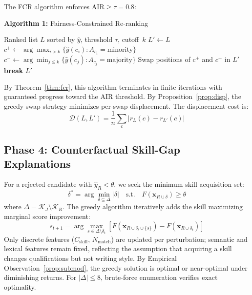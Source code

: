\documentclass[smallcondensed,numbers]{sn-jnl}
\begin{document}
The FCR algorithm enforces $\mathrm{AIR} \geq \tau = 0.8$:

\vspace{3pt}
\noindent\textbf{Algorithm 1:} Fairness-Constrained Re-ranking
\begin{algorithmic}[1]
\REQUIRE Ranked list $L$ sorted by $\hat{y}$, threshold $\tau$, cutoff~$k$
\STATE $L' \leftarrow L$
    \STATE $c^+ \leftarrow \arg\max_{i > k}\{\hat{y}(c_i) : A_{c_i} = \text{minority}\}$
    \STATE $c^- \leftarrow \arg\min_{j \leq k}\{\hat{y}(c_j) : A_{c_j} = \text{majority}\}$
        \STATE Swap positions of $c^+$ and $c^-$ in $L'$
    \ELSE
        \STATE \textbf{break}
    \ENDIF
\ENDWHILE
\RETURN $L'$
\end{algorithmic}
\vspace{3pt}

By Theorem~\ref{thm:fcr}, this algorithm terminates in finite iterations with guaranteed progress toward the AIR threshold. By Proposition~\ref{prop:disp}, the greedy swap strategy minimizes per-swap displacement. The displacement cost is:
\begin{equation}
    \mathcal{D}(L, L') = \frac{1}{n}\sum_{c} |r_L(c) - r_{L'}(c)|
\end{equation}

\subsection{Phase 4: Counterfactual Skill-Gap Explanations}

For a rejected candidate with $\hat{y}_R < \theta$, we seek the minimum skill acquisition set:
\begin{equation}
    \delta^* = \arg\min_{\delta \subseteq \Delta} |\delta| \quad \text{s.t.} \quad F(\mathbf{x}_{R \cup \delta}) \geq \theta
\end{equation}
where $\Delta = \mathcal{K}_J \setminus \mathcal{K}_R$. The greedy algorithm iteratively adds the skill maximizing marginal score improvement:
\begin{equation}
    s_{t+1} = \arg\max_{s \in \Delta \setminus \delta_t} \left[ F(\mathbf{x}_{R \cup \delta_t \cup \{s\}}) - F(\mathbf{x}_{R \cup \delta_t}) \right]
\end{equation}
Only discrete features ($C_\text{skill}$, $N_\text{match}$) are updated per perturbation; semantic and lexical features remain fixed, reflecting the assumption that acquiring a skill changes qualifications but not writing style. By Empirical Observation~\ref{prop:submod}, the greedy solution is optimal or near-optimal under diminishing returns. For $|\Delta| \leq 8$, brute-force enumeration verifies exact optimality.
\end{document}
